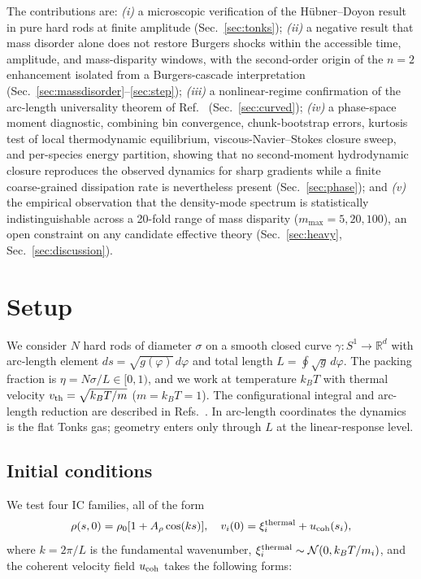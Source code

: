 \documentclass[aps,pre,twocolumn,superscriptaddress,longbibliography,floatfix]{revtex4-2}
\begin{document}
The contributions are:
\emph{(i)} a microscopic verification of the H\"ubner--Doyon
result in pure hard rods at finite amplitude
(Sec.~\ref{sec:tonks});
\emph{(ii)} a negative result that mass disorder alone does not
restore Burgers shocks within the accessible time, amplitude,
and mass-disparity windows, with the second-order origin of the
$n=2$ enhancement isolated from a Burgers-cascade interpretation
(Sec.~\ref{sec:massdisorder}--\ref{sec:step});
\emph{(iii)} a nonlinear-regime confirmation of the arc-length
universality theorem of Ref.~\cite{PaperI}
(Sec.~\ref{sec:curved});
\emph{(iv)} a phase-space moment diagnostic, combining bin
convergence, chunk-bootstrap errors, kurtosis test of local
thermodynamic equilibrium, viscous-Navier--Stokes closure sweep,
and per-species energy partition, showing that no second-moment
hydrodynamic closure reproduces the observed dynamics for sharp
gradients while a finite coarse-grained dissipation rate is
nevertheless present (Sec.~\ref{sec:phase}); and
\emph{(v)} the empirical observation that the density-mode
spectrum is statistically indistinguishable across a 20-fold
range of mass disparity ($m_{\max}=5,20,100$), an open
constraint on any candidate effective theory
(Sec.~\ref{sec:heavy}, Sec.~\ref{sec:discussion}).

\section{Setup}\label{sec:setup}

We consider $N$ hard rods of diameter $\sigma$ on a smooth
closed curve $\gamma:S^1\to\mathbb R^d$ with arc-length element
$ds=\sqrt{g(\varphi)}\,d\varphi$ and total length
$L=\oint\sqrt{g}\,d\varphi$. The packing fraction is
$\eta=N\sigma/L\in[0,1)$, and we work at temperature $k_BT$ with
thermal velocity $v_{\rm th}=\sqrt{k_BT/m}$ ($m=k_BT=1$). The
configurational integral and arc-length reduction are described
in Refs.~\cite{PaperI,PaperII}. In arc-length coordinates the
dynamics is the flat Tonks gas; geometry enters only through
$L$ at the linear-response level.

\subsection{Initial conditions}

We test four IC families, all of the form
\begin{equation}
\rho(s,0)=\rho_0[1+A_\rho \cos(k s)],\quad
v_i(0)=\xi_i^{\rm thermal}+u_{\rm coh}(s_i),
\end{equation}
where $k=2\pi/L$ is the fundamental wavenumber,
$\xi_i^{\rm thermal}\sim\mathcal{N}(0,k_BT/m_i)$, and the
coherent velocity field $u_{\rm coh}$ takes the following forms:
\end{document}
